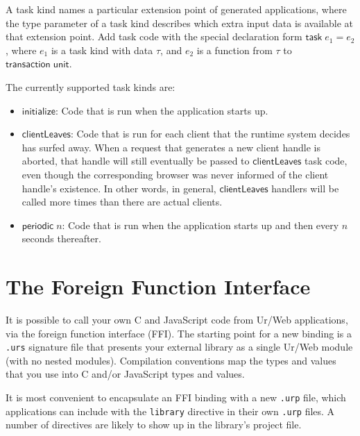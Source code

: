 \documentclass{article}
\newcommand{\mt}[1]{\mathsf{#1}}
\begin{document}
A task kind names a particular extension point of generated applications, where the type parameter of a task kind describes which extra input data is available at that extension point.  Add task code with the special declaration form $\mt{task} \; e_1 = e_2$, where $e_1$ is a task kind with data $\tau$, and $e_2$ is a function from $\tau$ to $\mt{transaction} \; \mt{unit}$.

The currently supported task kinds are:
\begin{itemize}
\item $\mt{initialize}$: Code that is run when the application starts up.
\item $\mt{clientLeaves}$: Code that is run for each client that the runtime system decides has surfed away.  When a request that generates a new client handle is aborted, that handle will still eventually be passed to $\mt{clientLeaves}$ task code, even though the corresponding browser was never informed of the client handle's existence.  In other words, in general, $\mt{clientLeaves}$ handlers will be called more times than there are actual clients.
\item $\mt{periodic} \; n$: Code that is run when the application starts up and then every $n$ seconds thereafter.
\end{itemize}


\section{The Foreign Function Interface}

It is possible to call your own C and JavaScript code from Ur/Web applications, via the foreign function interface (FFI).  The starting point for a new binding is a \texttt{.urs} signature file that presents your external library as a single Ur/Web module (with no nested modules).  Compilation conventions map the types and values that you use into C and/or JavaScript types and values.

It is most convenient to encapsulate an FFI binding with a new \texttt{.urp} file, which applications can include with the \texttt{library} directive in their own \texttt{.urp} files.  A number of directives are likely to show up in the library's project file.
\end{document}

